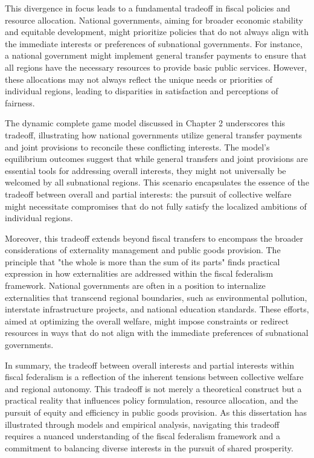 This divergence in focus leads to a fundamental tradeoff in fiscal policies and resource allocation. National governments, aiming for broader economic stability and equitable development, might prioritize policies that do not always align with the immediate interests or preferences of subnational governments. For instance, a national government might implement general transfer payments to ensure that all regions have the necessary resources to provide basic public services. However, these allocations may not always reflect the unique needs or priorities of individual regions, leading to disparities in satisfaction and perceptions of fairness.

The dynamic complete game model discussed in Chapter 2 underscores this tradeoff, illustrating how national governments utilize general transfer payments and joint provisions to reconcile these conflicting interests. The model's equilibrium outcomes suggest that while general transfers and joint provisions are essential tools for addressing overall interests, they might not universally be welcomed by all subnational regions. This scenario encapsulates the essence of the tradeoff between overall and partial interests: the pursuit of collective welfare might necessitate compromises that do not fully satisfy the localized ambitions of individual regions.

Moreover, this tradeoff extends beyond fiscal transfers to encompass the broader considerations of externality management and public goods provision. The principle that "the whole is more than the sum of its parts" finds practical expression in how externalities are addressed within the fiscal federalism framework\parencite{1988Foreign, Branstetter2001Are, 2011Procurement}. National governments are often in a position to internalize externalities that transcend regional boundaries, such as environmental pollution, interstate infrastructure projects, and national education standards. These efforts, aimed at optimizing the overall welfare, might impose constraints or redirect resources in ways that do not align with the immediate preferences of subnational governments.

In summary, the tradeoff between overall interests and partial interests within fiscal federalism is a reflection of the inherent tensions between collective welfare and regional autonomy. This tradeoff is not merely a theoretical construct but a practical reality that influences policy formulation, resource allocation, and the pursuit of equity and efficiency in public goods provision. As this dissertation has illustrated through models and empirical analysis, navigating this tradeoff requires a nuanced understanding of the fiscal federalism framework and a commitment to balancing diverse interests in the pursuit of shared prosperity.



